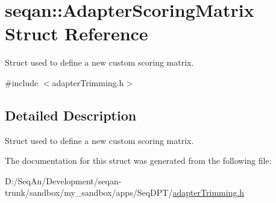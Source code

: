 \hypertarget{structseqan_1_1_adapter_scoring_matrix}{\section{seqan\-:\-:Adapter\-Scoring\-Matrix Struct Reference}
\label{structseqan_1_1_adapter_scoring_matrix}
}


Struct used to define a new custom scoring matrix.  




{\ttfamily \#include $<$adapter\-Trimming.\-h$>$}



\subsection{Detailed Description}
Struct used to define a new custom scoring matrix. 

The documentation for this struct was generated from the following file\-:\begin{DoxyCompactItemize}
\item 
D\-:/\-Seq\-An/\-Development/seqan-\/trunk/sandbox/my\-\_\-sandbox/apps/\-Seq\-D\-P\-T/\hyperlink{adapter_trimming_8h}{adapter\-Trimming.\-h}\end{DoxyCompactItemize}
